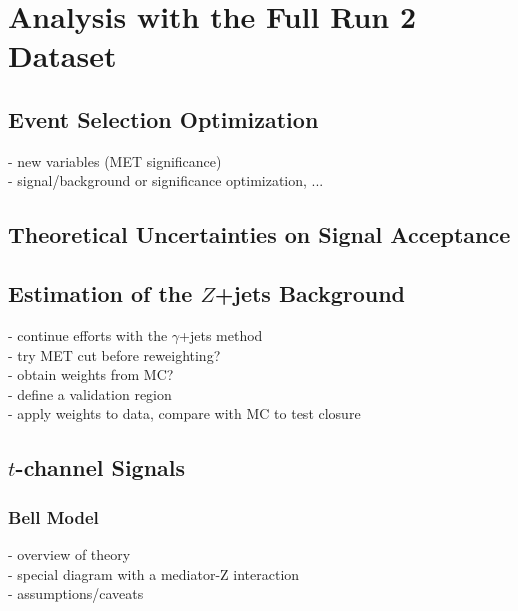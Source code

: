 \chapter{Analysis with the Full Run 2 Dataset}
\label{chapter:fullRun2}

\section{Event Selection Optimization}
- new variables (MET significance)\\
- signal/background or significance optimization, ...\\

\section{Theoretical Uncertainties on Signal Acceptance}

\section{Estimation of the $Z$+jets Background}

- continue efforts with the $\gamma$+jets method\\
- try MET cut before reweighting?\\
- obtain weights from MC?\\
- define a validation region\\
- apply weights to data, compare with MC to test closure\\

\section{$t$-channel Signals}

\subsection{Bell Model}

- overview of theory\\
- special diagram with a mediator-Z interaction\\
- assumptions/caveats\\

